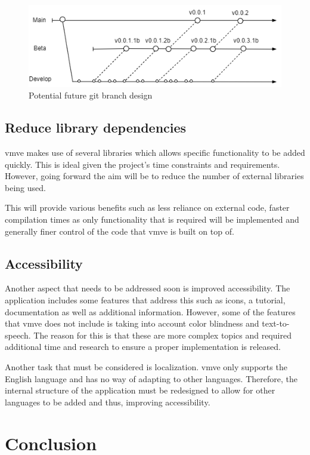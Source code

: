 \documentclass[11pt]{article}
\begin{document}
\begin{figure}[H]
  \centering
  \includegraphics[width=\textwidth]{images/future_branch_design.png}
  \caption{Potential future git branch design}
  \label{fig:futurebrancharch}
\end{figure}

\subsection{Reduce library dependencies}
\gls*{vmve} makes use of several libraries which allows specific functionality to
be added quickly. This is ideal given the project's time constraints and
requirements. However, going forward the aim will be to reduce the number of
external libraries being used.

This will provide various benefits such as less reliance on external code,
faster compilation times as only functionality that is required will be
implemented and generally finer control of the code that \gls*{vmve} is built on
top of.

\subsection{Accessibility}
Another aspect that needs to be addressed soon is improved accessibility. The
application includes some features that address this such as icons, a tutorial,
documentation as well as additional information. However, some of the features
that \gls*{vmve} does not include is taking into account color blindness and
text-to-speech. The reason for this is that these are more complex topics and
required additional time and research to ensure a proper implementation is
released.

Another task that must be considered is localization. \gls*{vmve} only supports
the English language and has no way of adapting to other languages. Therefore,
the internal structure of the application must be redesigned to allow for
other languages to be added and thus, improving accessibility.

\clearpage
\section{Conclusion}
\end{document}
